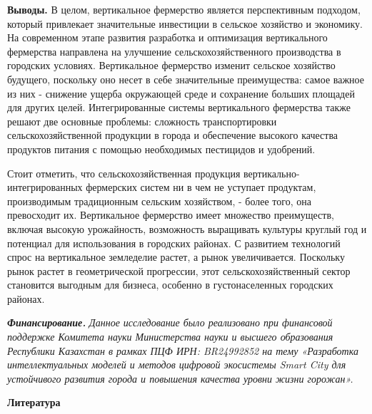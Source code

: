 \begin{multicols}{2}
{\bfseries Выводы.} В целом, вертикальное фермерство является перспективным
подходом, который привлекает значительные инвестиции в сельское
хозяйство и экономику. На современном этапе развития разработка и
оптимизация вертикального фермерства направлена на улучшение
сельскохозяйственного производства в городских условиях. Вертикальное
фермерство изменит сельское хозяйство будущего, поскольку оно несет в
себе значительные преимущества: самое важное из них - снижение ущерба
окружающей среде и сохранение больших площадей для других целей.
Интегрированные системы вертикального фермерства также решают две
основные проблемы: сложность транспортировки сельскохозяйственной
продукции в города и обеспечение высокого качества продуктов питания с
помощью необходимых пестицидов и удобрений.

Стоит отметить, что сельскохозяйственная продукция
вертикально-интегрированных фермерских систем ни в чем не уступает
продуктам, производимым традиционным сельским хозяйством, - более того,
она превосходит их. Вертикальное фермерство имеет множество преимуществ,
включая высокую урожайность, возможность выращивать культуры круглый год
и потенциал для использования в городских районах. С развитием
технологий спрос на вертикальное земледелие растет, а рынок
увеличивается. Поскольку рынок растет в геометрической прогрессии, этот
сельскохозяйственный сектор становится выгодным для бизнеса, особенно в
густонаселенных городских районах.

\emph{{\bfseries Финансирование.}} \emph{Данное исследование было
реализовано при финансовой поддержке Комитета науки Министерства науки и
высшего образования Республики Казахстан в рамках ПЦФ ИРН: BR24992852 на
тему «Разработка интеллектуальных моделей и методов цифровой экосистемы
Smart City для устойчивого развития города и повышения качества уровни
жизни горожан».}
\end{multicols}

\begin{center}
{\bfseries Литература}
\end{center}

